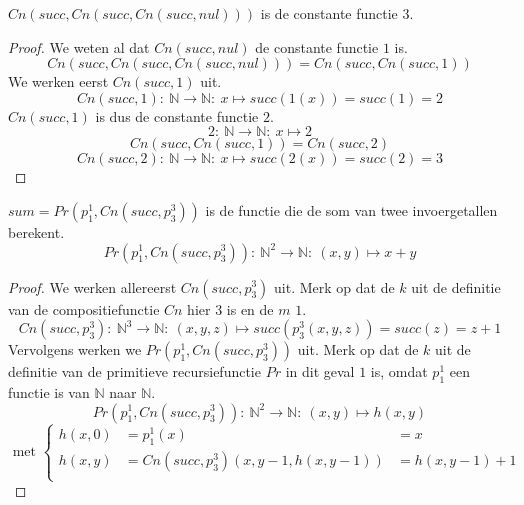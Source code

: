 \documentclass[main.tex]{subfiles}
\begin{document}
\begin{vb}
  $Cn(succ,Cn(succ,Cn(succ,nul)))$ is de constante functie $3$.
  
  \begin{proof}
    We weten al dat $Cn(succ,nul)$ de constante functie $1$ is.
    \[ Cn(succ,Cn(succ,Cn(succ,nul))) =  Cn(succ,Cn(succ,1)) \]
    We werken eerst $Cn(succ,1)$ uit.
    \[ Cn(succ,1):\ \mathbb{N} \rightarrow \mathbb{N}:\ x \mapsto succ(1(x)) = succ(1) = 2 \]
    $Cn(succ,1)$ is dus de constante functie $2$.
    \[ 2:\ \mathbb{N} \rightarrow \mathbb{N}:\ x \mapsto 2 \]
    \[ Cn(succ,Cn(succ,1)) = Cn(succ,2)\]
    \[ Cn(succ,2):\ \mathbb{N} \rightarrow \mathbb{N}:\ x \mapsto succ(2(x)) = succ(2) = 3 \]
  \end{proof}
\end{vb}

\begin{vb}
  $sum = Pr(p_{1}^{1},Cn(succ,p_{3}^{3}))$ is de functie die de som van twee invoergetallen berekent.
  \[ Pr(p_{1}^{1},Cn(succ,p_{3}^{3})):\ \mathbb{N}^{2} \rightarrow \mathbb{N}:\ (x,y) \mapsto x+y \]

  \begin{proof}
    We werken allereerst $Cn(succ,p_{3}^{3})$ uit.
    Merk op dat de $k$ uit de definitie van de compositiefunctie $Cn$ hier $3$ is en de $m$ $1$.
    \[ Cn(succ,p_{3}^{3}):\ \mathbb{N}^{3} \rightarrow \mathbb{N}:\ (x,y,z) \mapsto succ(p_{3}^{3}(x,y,z)) = succ(z) = z+1 \]
    Vervolgens werken we $Pr(p_{1}^{1},Cn(succ,p_{3}^{3}))$ uit.
    Merk op dat de $k$ uit de definitie van de primitieve recursiefunctie $Pr$ in dit geval $1$ is, omdat $p_{1}^{1}$ een functie is van $\mathbb{N}$ naar $\mathbb{N}$.
    \[ Pr(p_{1}^{1},Cn(succ,p_{3}^{3})):\ \mathbb{N}^{2} \rightarrow \mathbb{N}:\ (x,y) \mapsto h(x,y) \]
    \[
    \text{ met }
    \left\{
      \begin{array}{rll}
        h(x,0) &= p_{1}^{1}(x) &= x\\
        h(x,y) &= Cn(succ,p_{3}^{3})(x,y-1,h(x,y-1)) &= h(x,y-1) + 1\\
      \end{array}
    \right.
    \]
  \end{proof}
\end{vb}
\end{document}
